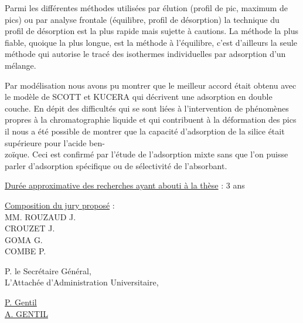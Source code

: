 Parmi les différentes méthodes utilisées par élution (profil de pic, maximum de pics) ou par analyse frontale (équilibre, profil de désorption) la technique du profil de désorption est la plus rapide mais sujette à cautions. La méthode la plus fiable, quoique la plus longue, est la méthode à l'équilibre, c'est d'ailleurs la seule méthode qui autorise le tracé des isothermes individuelles par adsorption d'un mélange.

Par modélisation nous avons pu montrer que le meilleur accord était obtenu avec le modèle de SCOTT et KUCERA qui décrivent une adsorption en double couche.
En dépit des difficultés qui se sont liées à l'intervention de phénomènes propres à la chromatographie liquide et qui contribuent à la déformation des pics il nous a été possible de montrer que la capacité d'adsorption de la silice était supérieure pour l'acide ben-\\
zoïque. Ceci est confirmé par l'étude de l'adsorption mixte sans que l'on puisse parler d'adsorption spécifique ou de sélectivité de l'absorbant.

\uline{Durée approximative des recherches ayant abouti à la thèse} : 3 ans

\uline{Composition du jury proposé} :\\
MM. ROUZAUD J.\\
\hspace*{2em}CROUZET J.\\
\hspace*{2em}GOMA G.\\
\hspace*{2em}COMBE P.

P. le Secrétaire Général,\\
L'Attachée d'Administration Universitaire,

\uline{P. Gentil}\\
\uline{A. GENTIL}



